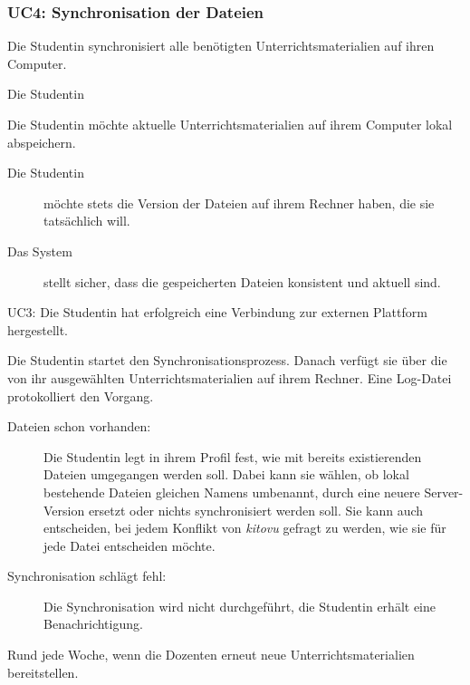 \documentclass[a4paper]{article}
\begin{document}
\subsubsection{UC4: Synchronisation der Dateien}

\begin{description}[uclist]
  \item[Goal] Die Studentin synchronisiert alle benötigten Unterrichtsmaterialien auf ihren Computer.
  \item[Primary Actor] Die Studentin
  \item[Trigger] Die Studentin möchte aktuelle Unterrichtsmaterialien auf ihrem Computer lokal abspeichern.
  \item[Stakeholders and Interests]
    \begin{description}
      \item[Die Studentin] möchte stets die Version der Dateien auf ihrem Rechner haben, die sie tatsächlich will.
      \item[Das System] stellt sicher, dass die gespeicherten Dateien konsistent und aktuell sind.
    \end{description}
  \item[Preconditions] UC3: Die Studentin hat erfolgreich eine Verbindung zur externen Plattform hergestellt.
  \item[Main Success Scenario] Die Studentin startet den Synchronisationsprozess. Danach verfügt sie über die von ihr ausgewählten Unterrichtsmaterialien auf ihrem Rechner. Eine Log-Datei protokolliert den Vorgang.
  \item[Extensions]
    \begin{description}
      \item[Dateien schon vorhanden:] Die Studentin legt in ihrem Profil fest, wie mit bereits existierenden Dateien umgegangen werden soll. Dabei kann sie wählen, ob lokal bestehende Dateien gleichen Namens umbenannt, durch eine neuere Server-Version ersetzt oder nichts synchronisiert werden soll. Sie kann auch entscheiden, bei jedem Konflikt von \emph{kitovu} gefragt zu werden, wie sie für jede Datei entscheiden möchte.
      \item[Synchronisation schlägt fehl:] Die Synchronisation wird nicht durchgeführt, die Studentin erhält eine Benachrichtigung.
    \end{description}
  \item[Frequency of Occurrence] Rund jede Woche, wenn die Dozenten erneut neue Unterrichtsmaterialien bereitstellen.
\end{description}
\end{document}
